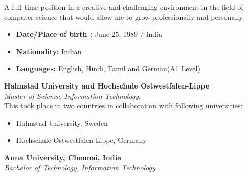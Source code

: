 \documentclass[11.9pt]{xetexCV}
\begin{document}
\makecvtitle

A full time position in a creative and challenging environment in the field of computer science that would allow me to grow professionally and personally.

\begin{itemize}
\item \textbf{{\color{bluesubheading}Date/Place of birth :}} \hspace{0.07cm} June 25, 1989 / India
\item \textbf{{\color{bluesubheading}Nationality:}} \hspace{1.45cm} Indian
\item \textbf{{\color{bluesubheading}Languages:}}\hspace{1.65cm} English, Hindi, Tamil and German(A1 Level)
\end{itemize}


\textbf{{\color{bluesubheading}Halmstad University and Hochschule Ostwestfalen-Lippe}}  \\ 
\vspace{1.5mm}%
\textit{Master of Science, Information Technology}.\\
This took place in two countries in collaboration with following universities:\\
\vspace{-5mm}
\begin{itemize}
\addtolength{\itemindent}{4.5cm}
\item Halmstad University, Sweden
\item Hochschule Ostwestfalen-Lippe, Germany 
\end{itemize}

\textbf{{\color{bluesubheading}Anna University, Chennai, India}}  \\ 
\textit{Bachelor of Technology, Information Technology}.\\

\end{document}
